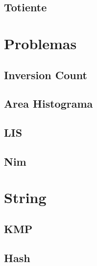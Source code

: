 \documentclass[12pt, a4paper, twoside]{article}
\begin{document}
\subsection{Totiente}




%
%

\section{Problemas}

\subsection{Inversion Count}


\subsection{Area Histograma}


\subsection{LIS}


\subsection{Nim}




%
%

\section{String}

\subsection{KMP}


\subsection{Hash}

\end{document}
